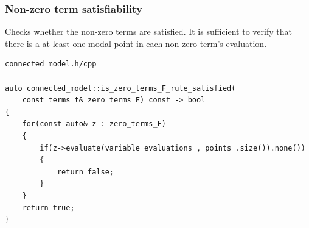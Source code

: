 \documentclass{article}
\begin{document}
	\newpage
	\subsubsection*{Non-zero term satisfiability}
	Checks whether the non-zero terms are satisfied. It is sufficient to verify that there is a at least one modal point in each non-zero term's evaluation.
\\
\begin{lstlisting}
connected_model.h/cpp

auto connected_model::is_zero_terms_F_rule_satisfied(
	const terms_t& zero_terms_F) const -> bool
{
    for(const auto& z : zero_terms_F)
    {
        if(z->evaluate(variable_evaluations_, points_.size()).none())
        {
            return false;
        }
    }
    return true;
}
\end{lstlisting}

	\newpage
\end{document}
